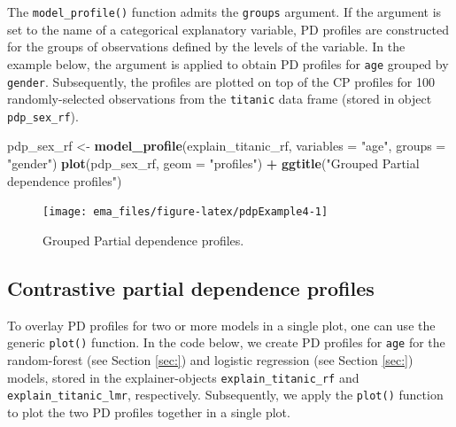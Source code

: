 \documentclass[]{krantz}
\newenvironment{Shaded}{\begin{snugshade}}{\end{snugshade}}
\newcommand{\DataTypeTok}[1]{\textcolor[rgb]{0.13,0.29,0.53}{#1}}
\newcommand{\KeywordTok}[1]{\textcolor[rgb]{0.13,0.29,0.53}{\textbf{#1}}}
\newcommand{\NormalTok}[1]{#1}
\newcommand{\OperatorTok}[1]{\textcolor[rgb]{0.81,0.36,0.00}{\textbf{#1}}}
\newcommand{\StringTok}[1]{\textcolor[rgb]{0.31,0.60,0.02}{#1}}
\begin{document}
The \texttt{model\_profile()} function admits the \texttt{groups} argument. If the argument is set to the name of a categorical explanatory variable, PD profiles are constructed for the groups of observations defined by the levels of the variable. In the example below, the argument is applied to obtain PD profiles for \texttt{age} grouped by \texttt{gender}. Subsequently, the profiles are plotted on top of the CP profiles for 100 randomly-selected observations from the \texttt{titanic} data frame (stored in object \texttt{pdp\_sex\_rf}).

\begin{Shaded}
\begin{Highlighting}[]
\NormalTok{pdp_sex_rf <-}\StringTok{ }\KeywordTok{model_profile}\NormalTok{(explain_titanic_rf, }\DataTypeTok{variables =} \StringTok{"age"}\NormalTok{, }\DataTypeTok{groups =} \StringTok{"gender"}\NormalTok{)}
\KeywordTok{plot}\NormalTok{(pdp_sex_rf, }\DataTypeTok{geom =} \StringTok{"profiles"}\NormalTok{) }\OperatorTok{+}
\StringTok{  }\KeywordTok{ggtitle}\NormalTok{(}\StringTok{"Grouped Partial dependence profiles"}\NormalTok{) }
\end{Highlighting}
\end{Shaded}

\begin{figure}

{\centering \texttt{[image: ema\_files/figure-latex/pdpExample4-1]} 

}

\caption{Grouped Partial dependence profiles.}\label{fig:pdpExample4}
\end{figure}

\hypertarget{contrastive-partial-dependence-profiles-1}{%
\subsection{Contrastive partial dependence profiles}\label{contrastive-partial-dependence-profiles-1}}

To overlay PD profiles for two or more models in a single plot, one can use the generic \texttt{plot()} function. In the code below, we create PD profiles for \texttt{age} for the random-forest (see Section \ref{sec:}) and logistic regression (see Section \ref{sec:}) models, stored in the explainer-objects \texttt{explain\_titanic\_rf} and \texttt{explain\_titanic\_lmr}, respectively. Subsequently, we apply the \texttt{plot()} function to plot the two PD profiles together in a single plot.
\end{document}
